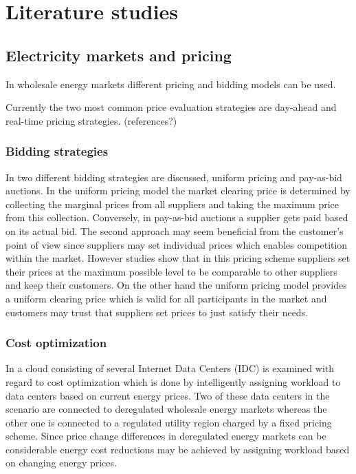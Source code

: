 

\section{Literature studies}

\subsection{Electricity markets and pricing}

In wholesale energy markets different pricing and bidding models can be used. 

Currently the two most common price evaluation strategies are day-ahead and real-time pricing strategies. (references?)

\subsubsection{Bidding strategies}

In \cite{tierney2008uniform} two different bidding strategies are discussed, uniform pricing and pay-as-bid auctions. In the uniform pricing model the market clearing price is determined by collecting the marginal prices from all suppliers and taking the maximum price from this collection. Conversely, in pay-as-bid auctions a supplier gets paid based on its actual bid. 
The second approach may seem beneficial from the customer's point of view since suppliers may set individual prices which enables competition within the market. 
However studies show that in this pricing scheme suppliers set their prices at the maximum possible level to be comparable to other suppliers and keep their customers. On the other hand the uniform pricing model provides a uniform clearing price which is valid for all participants in the market and customers may trust that suppliers set prices to just satisfy their needs. 

\subsubsection{Cost optimization}

In \cite{rao2010minimizing} a cloud consisting of several Internet Data Centers (IDC) is examined with regard to cost optimization which is done by intelligently assigning workload to data centers based on current energy prices. Two of these data centers in the scenario are connected to deregulated wholesale energy markets whereas the other one is connected to a regulated utility region charged by a fixed pricing scheme. Since price change differences in deregulated energy markets can be considerable energy cost reductions may be achieved by assigning workload based on changing energy prices.  %

